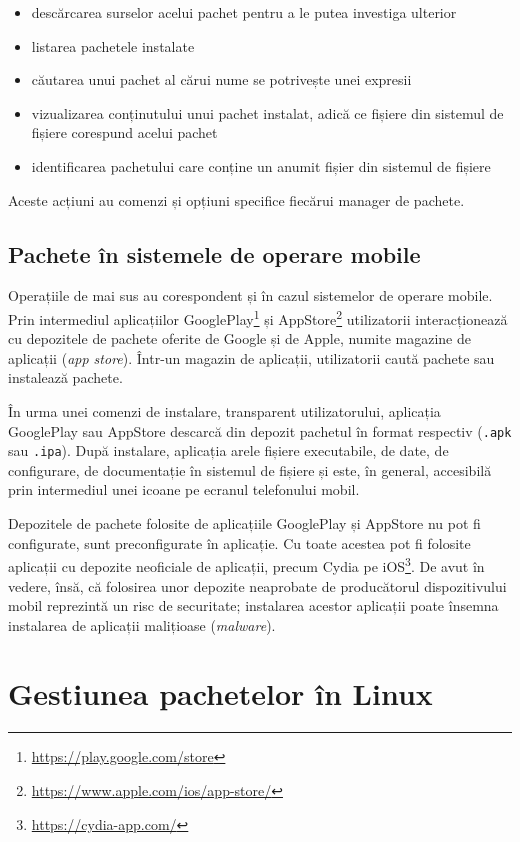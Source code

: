 \begin{itemize}
  \item descărcarea surselor acelui pachet pentru a le putea investiga ulterior
  \item listarea pachetele instalate
  \item căutarea unui pachet al cărui nume se potrivește unei expresii
  \item vizualizarea conținutului unui pachet instalat, adică ce fișiere din sistemul de fișiere corespund acelui pachet
  \item identificarea pachetului care conține un anumit fișier din sistemul de fișiere
\end{itemize}
Aceste acțiuni au comenzi și opțiuni specifice fiecărui manager de pachete.

\subsection{Pachete în sistemele de operare mobile}
\label{sec:package:mobile}

Operațiile de mai sus au corespondent și în cazul sistemelor de operare mobile.
Prin intermediul aplicațiilor GooglePlay\footnote{\url{https://play.google.com/store}} și AppStore\footnote{\url{https://www.apple.com/ios/app-store/}} utilizatorii interacționează cu depozitele de pachete oferite de Google și de Apple, numite magazine de aplicații (\textit{app store}).
Într-un magazin de aplicații, utilizatorii caută pachete sau instalează pachete.

În urma unei comenzi de instalare, transparent utilizatorului, aplicația GooglePlay sau AppStore descarcă din depozit pachetul în format respectiv (\texttt{.apk} sau \texttt{.ipa}).
După instalare, aplicația arele fișiere executabile, de date, de configurare, de documentație în sistemul de fișiere și este, în general, accesibilă prin intermediul unei icoane pe ecranul telefonului mobil.

Depozitele de pachete folosite de aplicațiile GooglePlay și AppStore nu pot fi configurate, sunt preconfigurate în aplicație.
Cu toate acestea pot fi folosite aplicații cu depozite neoficiale de aplicații, precum Cydia pe iOS\footnote{\url{https://cydia-app.com/}}.
De avut în vedere, însă, că folosirea unor depozite neaprobate de producătorul dispozitivului mobil reprezintă un risc de securitate;
instalarea acestor aplicații poate însemna instalarea de aplicații malițioase (\textit{malware}).

\section{Gestiunea pachetelor în Linux}
\label{sec:package:linux}

